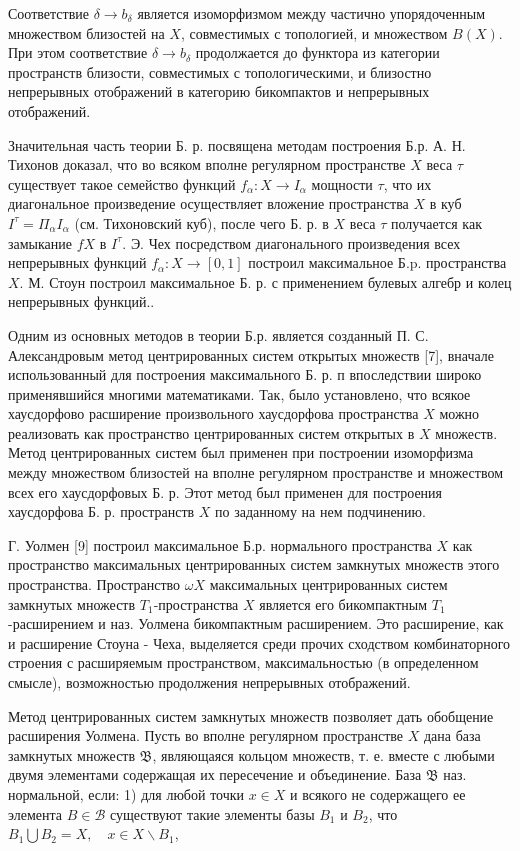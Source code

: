 \documentclass[10pt]{article}
\begin{document}
Соответствие $\delta \rightarrow b_{\delta}$ является изоморфизмом между частично упорядоченным множеством близостей на $X$, совместимых с топологией, и множеством $B(X)$. При этом соответствие $\delta \rightarrow b_{\delta}$ продолжается до функтора из категории пространств близости, совместимых с топологическими, и близостно непрерывных отображений в категорию бикомпактов и непрерывных отображений.



Значительная часть теории Б. р. посвящена методам построения Б.р. А. Н. Тихонов доказал, что во всяком вполне регулярном пространстве $X$ веса $\tau$ существует такое семейство функций $f_{\alpha}: X \rightarrow I_{\alpha}$ мощности $\tau$, что их диагональное произведение осуществляет вложение пространства $X$ в куб $I^{\tau}=\Pi_{\alpha} I_{\alpha}$ (см. Тихоновский куб), после чего Б. р. в $X$ веса $\tau$ получается как замыкание $f X$ в $I^{\tau}$. Э. Чех посредством диагонального произведения всех непрерывных функций $f_{\alpha}: X \rightarrow[0,1]$ построил максимальное Б.p. пространства $X$. М. Стоун построил максимальное Б. р. с применением булевых алгебр и колец непрерывных функций..



Одним из основных методов в теории Б.р. является созданный П. С. Александровым метод центрированных систем открытых множеств [7], вначале использованный для построения максимального Б. р. п впоследствии широко применявшийся многими математиками. Так, было установлено, что всякое хаусдорфово расширение произвольного хаусдорфова пространства $X$ можно реализовать как пространство центрированных систем открытых в $X$ множеств. Метод центрированных систем был применен при построении изоморфизма между множеством близостей на вполне регулярном пространстве и множеством всех его хаусдорфовых Б. р. Этот метод был применен для построения хаусдорфова Б. р. пространств $X$ по заданному на нем подчинению.



Г. Уолмен [9] построил максимальное Б.р. нормального пространства $X$ как пространство максимальных центрированных систем замкнутых множеств этого пространства. Пространство $\omega X$ максимальных центрированных систем замкнутых множеств $T_{1}$-пространства $X$ является его бикомпактным $T_{1}$-расширением и наз. Уолмена бикомпактным расширением. Это расширение, как и расширение Стоуна - Чеха, выделяется среди прочих сходством комбинаторного строения с расширяемым пространством, максимальностью (в определенном смысле), возможностью продолжения непрерывных отображений.



Метод центрированных систем замкнутых множеств позволяет дать обобщение расширения Уолмена. Пусть во вполне регулярном пространстве $X$ дана база замкнутых множеств $\mathfrak{B}$, являющаяся кольцом множеств, т. е. вместе с любыми двумя элементами содержащая их пересечение и объединение. База $\mathfrak{B}$ наз. нормальной, если: 1) для любой точки $x \in X$ и всякого не содержащего ее элемента $B \in \mathscr{B}$ существуют такие элементы базы $B_{1}$ и $B_{2}$, что $B_{1} \bigcup B_{2}=X, \quad x \in X \backslash B_{1}$,
\end{document}
